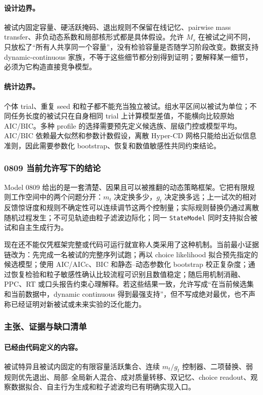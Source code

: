 \paragraph{设计边界。}
被试内固定容量、硬活跃掩码、退出规则不保留在线记忆、pairwise mass transfer、非负动态系数和局部核形式都是具体假设。允许 $M_s$ 在被试之间不同，只放松了“所有人共享同一个容量”，没有检验容量是否随学习阶段改变。数据支持 dynamic-continuous 家族，不等于这些细节都分别得到证明；要解释某一细节，必须为它构造直接竞争模型。

\paragraph{统计边界。}
个体 trial、重复 seed 和粒子都不能充当独立被试。组水平区间以被试为单位；不同任务长度的被试只在自身相同 trial 上计算模型差值，不能横向比较原始 AIC/BIC。多种 profile 的选择需要预先定义候选族、层级门控或模型平均。AIC/BIC 依赖最大似然和参数计数假设，离散 Hyper-CD 网格只能给出近似信息准则，因此需要参数化 bootstrap、恢复和数值敏感性共同约束结论。


\subsubsection{0809 当前允许写下的结论}

Model 0809 给出的是一套清楚、因果且可以被推翻的动态策略框架。它把有限规则工作空间中的两个问题分开：$m_t$ 决定换多少，$g_t$ 决定换多远；上一试次的相对反馈惊讶度和规则不确定性可以连续调节这两个控制量；实际规则替换仍通过离散随机过程发生；不可见轨迹由粒子滤波边际化；同一 \texttt{StateModel} 同时支持拟合被试和自主生成行为。

现在还不能仅凭框架完整或代码可运行就宣称人类采用了这种机制。当前最小证据链改为：先完成一名被试的完整序列试跑；再以 choice likelihood 拟合预先指定的候选模型；使用 AIC/AICc、BIC 和静态--动态参数化 bootstrap 校正复杂度；通过恢复检验和粒子敏感性确认比较流程可识别且数值稳定；随后用机制消融、PPC、RT 或口头报告约束心理解释。若这些结果一致，允许写成“在当前候选集和当前数据中，dynamic continuous 得到最强支持”，但不写成绝对最优，也不声称已经证明对新被试或未来实验的泛化能力。


\subsubsection{主张、证据与缺口清单}

\paragraph{已经由代码定义的内容。}
被试特异且被试内固定的有限容量活跃集合、连续 $m_t/g_t$ 控制器、二项替换、弱规则优先退出、局部--全局新人混合、成对质量转移、双记忆、choice readout、观察数据拟合、自主行为生成和粒子滤波均已有明确实现入口。

